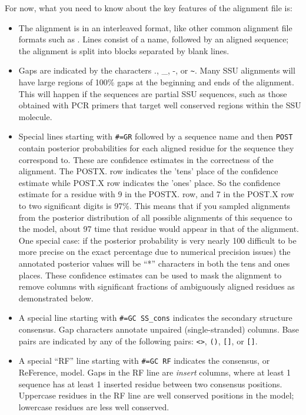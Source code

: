 For now, what you need to know about the key features of the alignment file is:
\begin{itemize}

\item The alignment is in an interleaved format, like other
  common alignment file formats such as .
  Lines consist of a name, followed by an aligned sequence;
  the alignment is split into blocks separated by blank lines.

\item Gaps are indicated by the characters ., \_, -, or \verb+~+.
  Many SSU alignments will have large regions of 100\% gaps at the
  beginning and ends of the alignment. 
  This will happen if the sequences are 
  partial SSU sequences, such as those  obtained with PCR
  primers that target well conserved regions within the SSU
  molecule.

\item Special lines starting with {\small\verb+#=GR+} followed by a
  sequence name and then {\small\verb+POST+} contain posterior
  probabilities for each aligned residue for the sequence they
  correspond to. These are confidence estimates in the correctness of
  the alignment.  The POSTX. row indicates the ’tens’ place of the
  confidence estimate while POST.X row indicates the ’ones’ place. So
  the confidence estimate for a residue with 9 in the POSTX. row, and
  7 in the POST.X row to two significant digits is 97\%. This means that
  if you sampled alignments from the posterior distribution of all
  possible alignments of this sequence to the model, about 97%
  time that residue would appear in that of the alignment. One special
  case: if the posterior probability is very nearly 100%
  difficult to be more precise on the exact percentage due to
  numerical precision issues) the annotated posterior values will be
  ``*'' characters in both the tens and ones places. These confidence
  estimates can be used to mask the alignment to remove columns with
  significant fractions of ambiguously aligned residues as demonstrated
  below.

\item A special line starting with {\small\verb+#=GC SS_cons+}
  indicates the secondary structure consensus. Gap characters annotate
  unpaired (single-stranded) columns. Base pairs are indicated by any
  of the following pairs: \verb+<>+, \verb+()+, \verb+[]+, or
  \verb+[]+.

\item A special ``RF'' line starting with {\small\verb+#=GC RF+}
  indicates the consensus, or ReFerence, model. Gaps in the RF line
  are \emph{insert} columns, where at least 1 sequence has at least 1
  inserted residue between two consensus positions. Uppercase residues
  in the RF line are well conserved positions in the model; lowercase
  residues are less well conserved.
\end{itemize}

